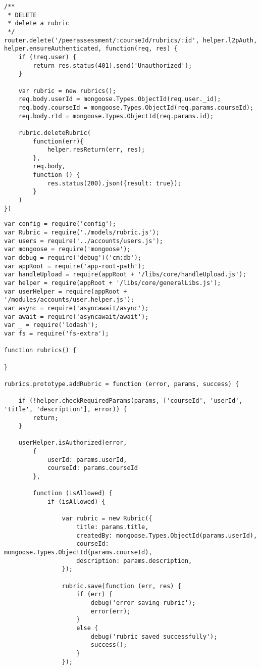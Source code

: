 \begin{lstlisting}[caption=Example of rubric controller]
/**
 * DELETE
 * delete a rubric
 */
router.delete('/peerassessment/:courseId/rubrics/:id', helper.l2pAuth, helper.ensureAuthenticated, function(req, res) {
    if (!req.user) {
        return res.status(401).send('Unauthorized');
    }

    var rubric = new rubrics();
    req.body.userId = mongoose.Types.ObjectId(req.user._id);
    req.body.courseId = mongoose.Types.ObjectId(req.params.courseId);
    req.body.rId = mongoose.Types.ObjectId(req.params.id);

    rubric.deleteRubric(
        function(err){
            helper.resReturn(err, res);
        },
        req.body,
        function () {
            res.status(200).json({result: true});
        }
    )
})
\end{lstlisting}

\begin{lstlisting}[caption=Example of rubric module]
var config = require('config');
var Rubric = require('./models/rubric.js');
var users = require('../accounts/users.js');
var mongoose = require('mongoose');
var debug = require('debug')('cm:db');
var appRoot = require('app-root-path');
var handleUpload = require(appRoot + '/libs/core/handleUpload.js');
var helper = require(appRoot + '/libs/core/generalLibs.js');
var userHelper = require(appRoot + '/modules/accounts/user.helper.js');
var async = require('asyncawait/async');
var await = require('asyncawait/await');
var _ = require('lodash');
var fs = require('fs-extra');

function rubrics() {

}

rubrics.prototype.addRubric = function (error, params, success) {

    if (!helper.checkRequiredParams(params, ['courseId', 'userId', 'title', 'description'], error)) {
        return;
    }

    userHelper.isAuthorized(error,
        {
            userId: params.userId,
            courseId: params.courseId
        },

        function (isAllowed) {
            if (isAllowed) {

                var rubric = new Rubric({
                    title: params.title,
                    createdBy: mongoose.Types.ObjectId(params.userId),
                    courseId: mongoose.Types.ObjectId(params.courseId),
                    description: params.description,
                });

                rubric.save(function (err, res) {
                    if (err) {
                        debug('error saving rubric');
                        error(err);
                    }
                    else {
                        debug('rubric saved successfully');
                        success();
                    }
                });


\end{lstlisting}

